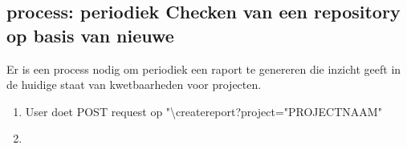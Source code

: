 \subsection{process: periodiek Checken van een repository op basis van nieuwe }\label{subsec:process:-periodiek-checken}
Er is een process nodig om periodiek een raport te genereren die inzicht geeft in de huidige staat van kwetbaarheden voor projecten.

\begin{enumerate}
    \item User doet POST request op "\textbackslash createreport?project="PROJECTNAAM"
    \item 
\end{enumerate}


